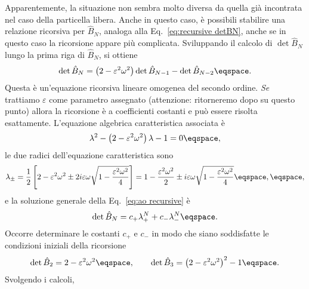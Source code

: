 Apparentemente, la situazione non sembra molto diversa da quella gi\`a
incontrata nel caso della particella libera.
Anche in questo caso, \`e possibili stabilire una relazione ricorsiva per
$\hat{B}_{N}$, analoga alla Eq.~\eqref{eq:recursive detBN}, anche se in questo
caso la ricorsione appare pi\`u complicata. 
Sviluppando  il calcolo di $\det \hat{B}_{N}$ lungo la prima riga di
$\hat{B}_{N}$, 
si ottiene
\begin{equation}\label{eq:ao recursive}
\det \hat{B}_{N} = \left( 2 - \varepsilon^{2} \omega^{2} \right) \det
\hat{B}_{N-1}  - \det \hat{B}_{N-2} \eqspace .
\end{equation}
Questa \`e un'equazione ricorsiva lineare omogenea del secondo ordine.
\emph{Se} trattiamo $\varepsilon$ come parametro assegnato (attenzione:
ritorneremo dopo su questo punto) allora la ricorsione \`e  a 
coefficienti costanti e pu\`o essere risolta esattamente.
L'equazione algebrica caratteristica associata \`e
\begin{displaymath}
\lambda^{2} - \left( 2 - \varepsilon^{2} \omega^2 \right) \lambda - 1 = 0
\eqspace ,
\end{displaymath}
le due radici dell'equazione caratteristica sono
\begin{displaymath}
\lambda_{\pm} = \frac{1}{2} \left[ 2 - \varepsilon^{2} \omega^{2} \pm  2i
\varepsilon \omega \sqrt{  1- \frac{\varepsilon^{2} \omega^{2}}{4} } \right] = 
1 - \frac{\varepsilon^{2} \omega^{2}}{2} \pm i\varepsilon \omega \sqrt{1 -
\frac{\varepsilon^{2} \omega^{2}}{4}} \eqspace ,
\eqspace, 
\end{displaymath}
e la soluzione generale della Eq.~\eqref{eq:ao recursive} \`e
\begin{displaymath}
\det \hat{B}_{N} = c_{+} \lambda_{+}^{N} + c_{-} \lambda_{-}^{N} \eqspace .
\end{displaymath}
Occorre determinare le costanti $c_{+}$ e $c_{-}$ in modo che  siano soddisfatte
le condizioni iniziali della ricorsione
\begin{displaymath}
\det \hat{B}_{2} = 2 - \varepsilon^{2} \omega^{2} \eqspace, \qquad 
\det \hat{B}_{3} = \left( 2 - \varepsilon^{2} \omega^{2} \right)^{2} - 1
\eqspace .
\end{displaymath}
Svolgendo i calcoli,%
